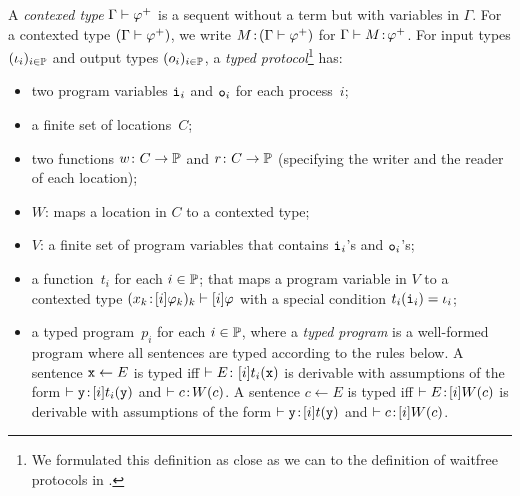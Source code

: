 A \textit{contexed type}
 $\Gamma\vdash{\varphi}^+$ is a sequent without a term but with variables in
 $\Gamma$.
For a contexted type $(\Gamma\vdash{\varphi}^+)$,
we write ${M} \mathord{\colon\kern -2pt}{(\Gamma\vdash{\varphi}^+)}$ for
$\Gamma\vdash{M} \mathord{\colon\kern -2pt}{{\varphi}^+}$.
For input types $(\iota_i)_{i\in\mathbb{P}}$
and output types $(o_i)_{i\in\mathbb{P}}$,
a \textit{typed protocol}\footnote{We formulated this definition
 as close as we can to the definition of waitfree protocols in \citet[\textbf{2.3.}]{saks2000wait}.} has:
\begin{itemize}
 \item two program variables
      $\texttt{i}_i$ and $\texttt{o}_i$ for each process~$i$;
 \item a finite set of locations~$C$;
 \item two functions $w\colon C\rightarrow \mathbb{P}$
       and $r\colon C\rightarrow
       \mathbb{P}$ (specifying the writer and the reader of
       each location);
 \item $W$: maps a location in $C$ to a contexted type;
 \item $V$: a finite set of program variables that contains $\texttt{i}_i$'s
       and $\texttt{o}_i$'s;
 \item a function~$t_i$ for each $i\in \mathbb{P}$;
       that maps a program variable in $V$ to a contexted type
       $({x_k} \mathord{\colon\kern -2pt}{[i]\varphi_k})_k \vdash[i]\varphi$ with a special condition
       $t_i(\texttt{i}_i)= \iota_i$;
 \item a typed program~$p_i$ for each $i\in \mathbb{P}$, where
       a \textit{typed program} is a well-formed
       program where all
       sentences are typed according to the rules below.
       A sentence $\texttt{x} \leftarrow E$ is typed  iff $\vdash E\colon [i]t_i(\texttt{x})$ is derivable with assumptions of the form $\vdash{\texttt{y}} \mathord{\colon\kern -2pt}{[i]t_i(\texttt{y})}$ and $\vdash{c} \mathord{\colon\kern -2pt}{W(c)}$.
       A sentence $c\leftarrow E$ is typed iff
       $\vdash{E} \mathord{\colon\kern -2pt}{[i]W(c)}$ is derivable with
       assumptions of the form $\vdash{\texttt{y}} \mathord{\colon\kern -2pt}{[i]t(\texttt{y})}$ and
       $\vdash{c} \mathord{\colon\kern -2pt}{[i]W(c)}$.
\end{itemize}
